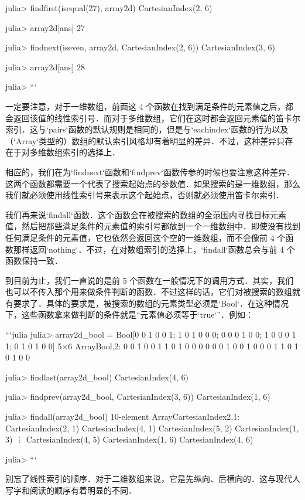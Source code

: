 julia> findfirst(isequal(27), array2d)
CartesianIndex(2, 6)

julia> array2d[ans]
27

julia> findnext(iseven, array2d, CartesianIndex(2, 6))
CartesianIndex(3, 6)

julia> array2d[ans]
28

julia> 
```

一定要注意，对于一维数组，前面这 4 个函数在找到满足条件的元素值之后，都会返回该值的线性索引号．而对于多维数组，它们在这时都会返回元素值的笛卡尔索引．这与`pairs`函数的默认规则是相同的，但是与`eachindex`函数的行为以及（`Array`类型的）数组的默认索引风格却有着明显的差异．不过，这种差异只存在于对多维数组索引的选择上．

相应的，我们在为`findnext`函数和`findprev`函数传参的时候也要注意这种差异．这两个函数都需要一个代表了搜索起始点的参数值．如果搜索的是一维数组，那么我们就必须使用线性索引号来表示这个起始点，否则就必须使用笛卡尔索引．

我们再来说`findall`函数．这个函数会在被搜索的数组的全范围内寻找目标元素值，然后把那些满足条件的元素值的索引号都放到一个一维数组中．即使没有找到任何满足条件的元素值，它也依然会返回这个空的一维数组，而不会像前 4 个函数那样返回`nothing`．不过，在对数组索引的选择上，`findall`函数总会与前 4 个函数保持一致．

到目前为止，我们一直说的是前 5 个函数在一般情况下的调用方式．其实，我们也可以不传入那个用来做条件判断的函数．不过这样的话，它们对被搜索的数组就有要求了．具体的要求是，被搜索的数组的元素类型必须是`Bool`．在这种情况下，这些函数拿来做判断的条件就是“元素值必须等于`true`”．例如：

```julia
julia> array2d_bool = Bool[0 0 1 0 0 1; 1 0 1 0 0 0; 0 0 0 1 0 0; 1 0 0 0 1 1; 0 1 0 1 0 0]
5×6 Array{Bool,2}:
 0  0  1  0  0  1
 1  0  1  0  0  0
 0  0  0  1  0  0
 1  0  0  0  1  1
 0  1  0  1  0  0

julia> findlast(array2d_bool)
CartesianIndex(4, 6)

julia> findprev(array2d_bool, CartesianIndex(3, 6))
CartesianIndex(1, 6)

julia> findall(array2d_bool)
10-element Array{CartesianIndex{2},1}:
 CartesianIndex(2, 1)
 CartesianIndex(4, 1)
 CartesianIndex(5, 2)
 CartesianIndex(1, 3)
 ⋮                   
 CartesianIndex(4, 5)
 CartesianIndex(1, 6)
 CartesianIndex(4, 6)

julia> 
```

别忘了线性索引的顺序．对于二维数组来说，它是先纵向、后横向的．这与现代人写字和阅读的顺序有着明显的不同．

